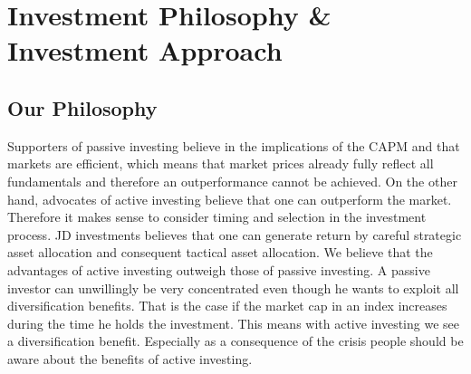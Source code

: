 \documentclass{scrreprt}
\begin{document}


\chapter{Investment Philosophy \& Investment Approach}
\section*{Our Philosophy}
Supporters of passive investing believe in the implications of the CAPM and that markets are efficient, which means that market prices already fully reflect all fundamentals and therefore an outperformance cannot be achieved.
On the other hand, advocates of active investing believe that one can outperform the market.
Therefore it makes sense to consider timing and selection in the investment process.
JD investments believes that one can generate return by careful strategic asset allocation and consequent tactical asset allocation.
We believe that the advantages of active investing outweigh those of passive investing.
A passive investor can unwillingly be very concentrated even though he wants to exploit all diversification benefits.
That is the case if the market cap in an index increases during the time he holds the investment.
This means with active investing we see a diversification benefit.
 Especially as a consequence of the crisis people should be aware about the benefits of active investing.
\end{document}
